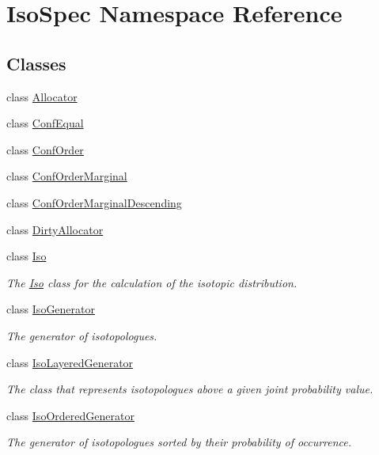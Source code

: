 \hypertarget{namespace_iso_spec}{}\section{Iso\+Spec Namespace Reference}
\label{namespace_iso_spec}
\subsection*{Classes}
\begin{DoxyCompactItemize}
\item 
class \mbox{\hyperlink{class_iso_spec_1_1_allocator}{Allocator}}
\item 
class \mbox{\hyperlink{class_iso_spec_1_1_conf_equal}{Conf\+Equal}}
\item 
class \mbox{\hyperlink{class_iso_spec_1_1_conf_order}{Conf\+Order}}
\item 
class \mbox{\hyperlink{class_iso_spec_1_1_conf_order_marginal}{Conf\+Order\+Marginal}}
\item 
class \mbox{\hyperlink{class_iso_spec_1_1_conf_order_marginal_descending}{Conf\+Order\+Marginal\+Descending}}
\item 
class \mbox{\hyperlink{class_iso_spec_1_1_dirty_allocator}{Dirty\+Allocator}}
\item 
class \mbox{\hyperlink{class_iso_spec_1_1_iso}{Iso}}
\begin{DoxyCompactList}\small\item\em The \mbox{\hyperlink{class_iso_spec_1_1_iso}{Iso}} class for the calculation of the isotopic distribution. \end{DoxyCompactList}\item 
class \mbox{\hyperlink{class_iso_spec_1_1_iso_generator}{Iso\+Generator}}
\begin{DoxyCompactList}\small\item\em The generator of isotopologues. \end{DoxyCompactList}\item 
class \mbox{\hyperlink{class_iso_spec_1_1_iso_layered_generator}{Iso\+Layered\+Generator}}
\begin{DoxyCompactList}\small\item\em The class that represents isotopologues above a given joint probability value. \end{DoxyCompactList}\item 
class \mbox{\hyperlink{class_iso_spec_1_1_iso_ordered_generator}{Iso\+Ordered\+Generator}}
\begin{DoxyCompactList}\small\item\em The generator of isotopologues sorted by their probability of occurrence. \end{DoxyCompactList}\item 

\end{DoxyCompactItemize}
